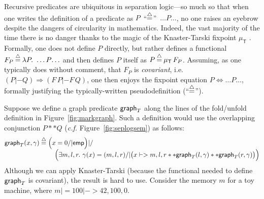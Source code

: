 \newcommand{\graphkt}{\p{graph}_T}
\newcommand{\grapham}{\p{graph}_A}


Recursive predicates are ubiquitous in separation logic---so
much so that when one writes the definition of a predicate as
\mbox{$P$ ``$\mathbin{\stackrel{\triangle}{=}}$'' $\ldots P \! \ldots$}, no one raises an eyebrow despite the
dangers of circularity in mathematics. Indeed, the vast majority of the time there
is no danger thanks to the magic of the Knaster-Tarski fixpoint
$\mu_{\mathsf{T}}$ \cite{tarski:fixpoint}.  Formally, one does not define $P$ directly,
but rather defines a functional
\mbox{$F_P \mathbin{\stackrel{\triangle}{=}} \lambda P.~ \ldots P \! \ldots$} and then defines $P$ itself as
\mbox{$P \mathbin{\stackrel{\triangle}{=}} \mu_{\mathsf{T}} \, F_P$}.
Assuming, as one typically does without comment,
that $F_P$ is \emph{covariant}, i.e. $(P |- Q)
\Rightarrow (F \, P |- F \, Q)$, one then enjoys the fixpoint
equation $P \Leftrightarrow \ldots P \ldots$, formally justifying
the typically-written pseudodefinition (``$\mathbin{\stackrel{\triangle}{=}}$'').


Suppose we define a graph predicate $\graphkt$ along the lines of the fold/unfold definition in Figure~\ref{fig:markgraph}.  Such a definition would use the overlapping conjunction $P ** Q$ (\emph{c.f.} Figure~\ref{fig:seplogsem}) as follows: %
\vspace{-1ex}
\[
\begin{array}{@{}l@{}l@{}}
\graphkt(x, \gamma) \; \defeq \; &\Big(x = 0 /| \p{emp}\Big) |/ \\
&\quad \Big(\exists m,l,r.~ \gamma(x)=(m,l,r) /|
\big(x |-> m,l,r ** \graphkt(l, \gamma) ** \graphkt(r, \gamma)\big)\Big)
\end{array}
\vspace{-1ex}
\]
Although we can apply Knaster-Tarski (because the functional needed to
define $\graphkt$ is covariant), the result is hard to use.
Consider the memory $m$ for a toy machine, where $m |= 100 |-> 42,100,0$.


